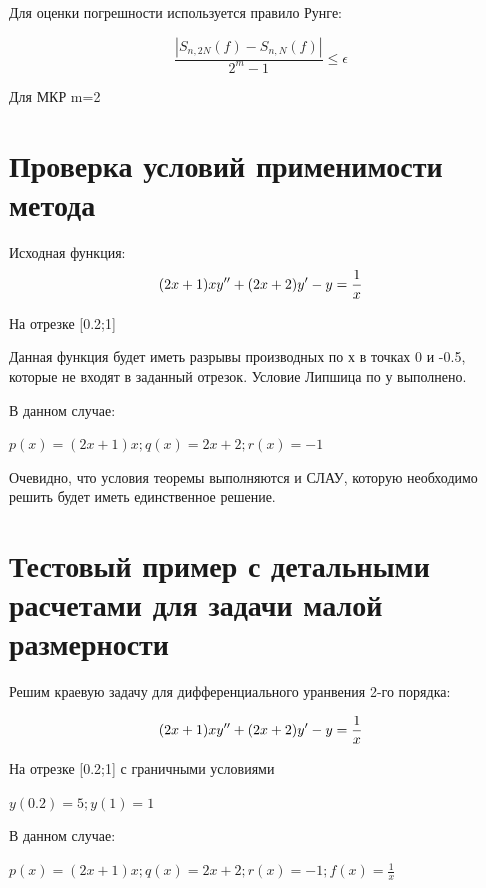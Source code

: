 Для оценки погрешности используется правило Рунге:

\begin{equation} 
	\frac{|S_{n,2N}(f)-S_{n,N}(f)|}{2^{m}-1} \leq \epsilon
\end{equation}

Для МКР m=2

\section{Проверка условий применимости метода}

Исходная функция: 
\begin{equation}
	(2x+1)xy''+(2x+2)y'-y=\frac{1}{x} \\
\end{equation}

На отрезке [0.2;1]

Данная функция будет иметь разрывы производных по х в точках 0 и -0.5, которые не входят в заданный отрезок. Условие Липшица по у выполнено. 

В данном случае: 

\begin{math}
	p(x) = (2x+1)x ; 	q(x) = 2x+2 ;	r(x) = -1 
\end{math}

Очевидно, что условия теоремы выполняются и СЛАУ, которую необходимо решить будет иметь единственное решение. 

\section{Тестовый пример с детальными расчетами для задачи малой размерности}

Решим краевую задачу для дифференциального уранвения 2-го порядка: 

\begin{equation}
	(2x+1)xy''+(2x+2)y'-y=\frac{1}{x} \\
\end{equation}

На отрезке [0.2;1] с граничными условиями

\begin{math}
	y(0.2)= 5 ;
	y(1) = 1 
\end{math}

В данном случае: 

\begin{math}
	p(x) = (2x+1)x ; 	q(x) = 2x+2 ;	r(x) = -1 ; f(x)=\frac{1}{x}
\end{math}

